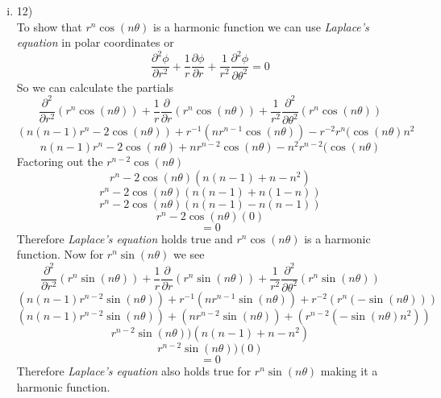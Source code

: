 \documentclass[11pt]{article}
\begin{document}
\begin{enumerate}
\begin{enumerate}[(i)]
\item 12)\\
To show that $r^n\cos(n\theta)$ is a harmonic function we can use \emph{Laplace's equation} in polar coordinates or
$$\frac{\partial^2\phi}{\partial r^2} + \frac{1}{r}\frac{\partial\phi}{\partial r}+\frac{1}{r^2}\frac{\partial^2\phi}{\partial \theta^2}=0$$
So we can calculate the partials
$$\frac{\partial^2}{\partial r^2}(r^n\cos(n\theta)) + \frac{1}{r}\frac{\partial}{\partial r}(r^n\cos(n\theta))+\frac{1}{r^2}\frac{\partial^2}{\partial \theta^2}(r^n\cos(n\theta))$$
$$(n(n-1)r^n-2\cos(n\theta)) + r^{-1}(nr^{n-1}\cos(n\theta))-r^{-2}r^n(\cos(n\theta)n^2$$
$$n(n-1)r^n-2\cos(n\theta) + nr^{n-2}\cos(n\theta)-n^2r^{n-2}(\cos(n\theta)$$
Factoring out the $r^{n-2}\cos(n\theta)$
$$r^n-2\cos(n\theta)(n(n-1) + n-n^2)$$
$$r^n-2\cos(n\theta)(n(n-1) + n(1-n))$$
$$r^n-2\cos(n\theta)(n(n-1) - n(n-1))$$
$$r^n-2\cos(n\theta)(0)$$
$$=0$$
Therefore \emph{Laplace's equation} holds true and $r^n\cos(n\theta)$ is a harmonic function. Now for $r^n\sin(n\theta)$ we see
$$\frac{\partial^2}{\partial r^2}(r^n\sin(n\theta)) + \frac{1}{r}\frac{\partial}{\partial r}(r^n\sin(n\theta))+\frac{1}{r^2}\frac{\partial^2}{\partial \theta^2}(r^n\sin(n\theta))$$
$$(n(n-1)r^{n-2}\sin(n\theta)) + r^{-1}(nr^{n-1}\sin(n\theta))+r^{-2}(r^n(-\sin(n\theta)))$$
$$(n(n-1)r^{n-2}\sin(n\theta)) + (nr^{n-2}\sin(n\theta))+(r^{n-2}(-\sin(n\theta)n^2))$$
$$r^{n-2}\sin(n\theta))(n(n-1) + n-n^2)$$
$$r^{n-2}\sin(n\theta))(0)$$
$$=0$$
Therefore \emph{Laplace's equation} also holds true for $r^n\sin(n\theta)$ making it a harmonic function. 


\end{enumerate}
\end{enumerate}
\end{document}
